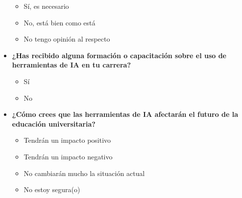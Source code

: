 \documentclass{article}
\newenvironment{recoleccionDeInformacion}{}{}
\begin{document}
\begin{recoleccionDeInformacion}
\begin{multicols}{2}
\begin{itemize}
      \begin{itemize}
        \item Sí, es necesario
        \item No, está bien como está
        \item No tengo opinión al respecto
      \end{itemize}
      \item \textbf{¿Has recibido alguna formación o capacitación sobre el uso de herramientas de IA en tu carrera?}
      \begin{itemize}
        \item Sí
        \item No
      \end{itemize}
      \item \textbf{¿Cómo crees que las herramientas de IA afectarán el futuro de la educación universitaria?}
      \begin{itemize}
        \item Tendrán un impacto positivo
        \item Tendrán un impacto negativo
        \item No cambiarán mucho la situación actual
        \item No estoy segura(o)
      \end{itemize}
  \end{itemize}
  \end{multicols}
\end{recoleccionDeInformacion}

\newpage
\end{document}

